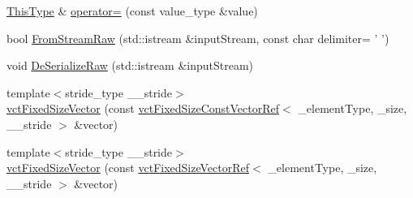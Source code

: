 \begin{DoxyCompactItemize}
\item 
\hyperlink{classvct_fixed_size_const_vector_base_a071063bc4fa43112cc287b2dbef53180}{This\-Type} \& \hyperlink{classvct_fixed_size_vector_a678b5e5c485fd4d489304731d47b73a1}{operator=} (const value\-\_\-type \&value)
\item 
bool \hyperlink{classvct_fixed_size_vector_a61750b6e61304640144fec19a9a65741}{From\-Stream\-Raw} (std\-::istream \&input\-Stream, const char delimiter= ' ')
\item 
void \hyperlink{classvct_fixed_size_vector_a87a245e3287fc139fc45f4a9935cb36f}{De\-Serialize\-Raw} (std\-::istream \&input\-Stream)
\end{DoxyCompactItemize}
{\bf }\par
\begin{DoxyCompactItemize}
\item 
{\footnotesize template$<$stride\-\_\-type \-\_\-\-\_\-stride$>$ }\\\hyperlink{classvct_fixed_size_vector_aab3dff36c45f37dcc0efc1b522ed704c}{vct\-Fixed\-Size\-Vector} (const \hyperlink{classvct_fixed_size_const_vector_ref}{vct\-Fixed\-Size\-Const\-Vector\-Ref}$<$ \-\_\-element\-Type, \-\_\-size, \-\_\-\-\_\-stride $>$ \&vector)
\item 
{\footnotesize template$<$stride\-\_\-type \-\_\-\-\_\-stride$>$ }\\\hyperlink{classvct_fixed_size_vector_a615b484a50c4d00c4f10f2dacd301a5c}{vct\-Fixed\-Size\-Vector} (const \hyperlink{classvct_fixed_size_vector_ref}{vct\-Fixed\-Size\-Vector\-Ref}$<$ \-\_\-element\-Type, \-\_\-size, \-\_\-\-\_\-stride $>$ \&vector)
\end{DoxyCompactItemize}

